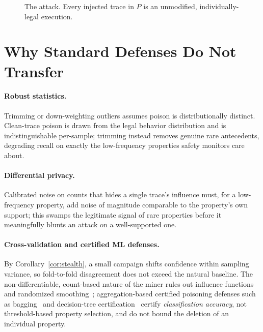 \documentclass[runningheads]{llncs}
\begin{document}
\begin{figure}[t]
\noindent{}
\caption{The attack. Every injected trace in $P$ is an unmodified, individually-legal execution.}
\label{alg:attack}
\end{figure}

\section{Why Standard Defenses Do Not Transfer}\label{sec:fail}
\paragraph{Robust statistics.} Trimming or down-weighting outliers assumes poison
is distributionally distinct. Clean-trace poison is drawn from the legal behavior
distribution and is indistinguishable per-sample; trimming instead removes
genuine rare antecedents, degrading recall on exactly the low-frequency
properties safety monitors care about.
\paragraph{Differential privacy.} Calibrated noise on counts that hides a single
trace's influence must, for a low-frequency property, add noise of magnitude
comparable to the property's own support; this swamps the legitimate signal of
rare properties before it meaningfully blunts an attack on a well-supported one.
\paragraph{Cross-validation and certified ML defenses.} By
Corollary~\ref{cor:stealth}, a small campaign shifts confidence within sampling
variance, so fold-to-fold disagreement does not exceed the natural baseline. The
non-differentiable, count-based nature of the miner rules out influence
functions~\cite{koh} and randomized smoothing~\cite{cohen}; aggregation-based
certified poisoning defenses such as bagging~\cite{baggingcert} and decision-tree
certification~\cite{certtree} certify \emph{classification accuracy}, not
threshold-based property selection, and do not bound the deletion of an
individual property.
\end{document}
